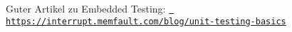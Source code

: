 Guter Artikel zu Embedded Testing\+: \href{https://interrupt.memfault.com/blog/unit-testing-basics}{\texttt{ https\+://interrupt.\+memfault.\+com/blog/unit-\/testing-\/basics}} 